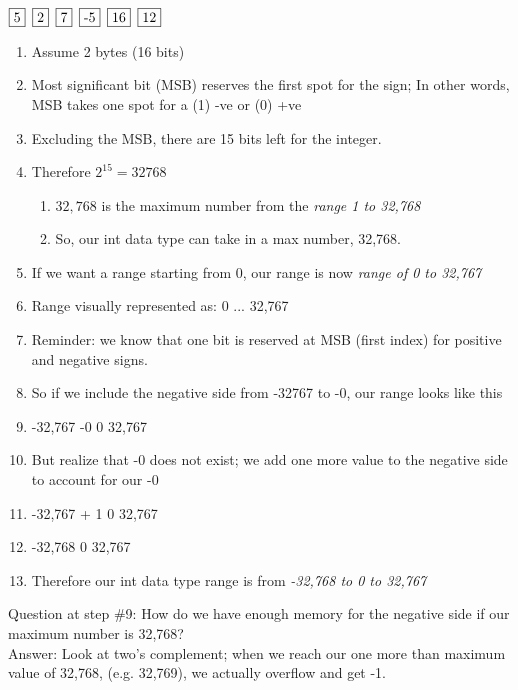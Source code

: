 \documentclass{article}
\begin{document}
  \newcommand{\lep}{\hspace*{.5em}}
  \noindent
  $\fbox{5} \lep \fbox{2} \lep \fbox{7} \lep \fbox{-5} \lep \fbox{16} \lep \fbox{12}$

\begin{enumerate}
	\item Assume 2 bytes (16 bits)
	\item Most significant bit (MSB) reserves the first spot for the sign; In other words, MSB takes one spot for a (1) -ve or (0) +ve
	\item Excluding the MSB, there are 15 bits left for the integer.
	\item Therefore $2^{15} = 32768$	
		\begin{enumerate}
			\item $32,768$ is the maximum number from the \textit{range 1 to 32,768}
			\item So, our int data type can take in a max number, 32,768.
		\end{enumerate}
	\item If we want a range starting from 0, our range is now \textit{range of 0 to 32,767}
	\item   Range visually represented as:  0     \hspace{1cm}  ...     32,767
	\item Reminder: we know that one bit is reserved at MSB (first index) for positive and negative signs. 
	\item  So if we include the negative side from -32767 to -0, our range looks like this
	\item -32,767  \hspace{1cm}        -0 \hspace {1cm} 0 \hspace {1cm} 32,767
	
	\item But realize that -0 does not exist; we add one more value to the negative side to account for our -0
	\item -32,767 + 1  \hspace {1cm} 0 \hspace {1cm} 32,767	
	\item -32,768  \hspace {1cm} 0 \hspace {1cm} 32,767
	\item Therefore our int data type range is from \textit{-32,768 to 0 to 32,767}
\end{enumerate}	

Question at step \#9: How do we have enough memory for the negative side if our maximum number is 32,768? \\
Answer: Look at two's complement; when we reach our one more than maximum value of 32,768, (e.g. 32,769), we actually overflow and get -1. 
\end{document}
